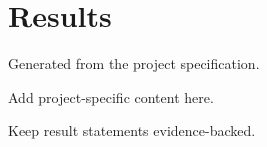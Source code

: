 \section{Results}
Generated from the project specification.

Add project-specific content here.

Keep result statements evidence-backed.
